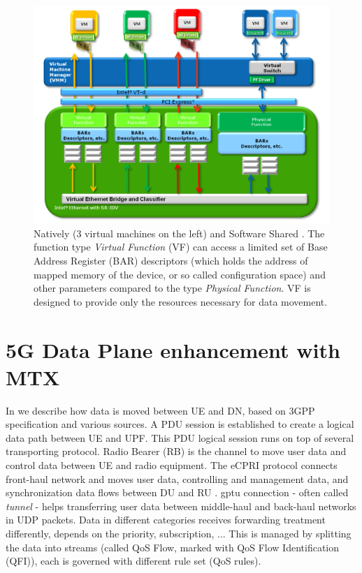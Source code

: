 \begin{figure}[H]
	\centering
	\includegraphics[width=1.0\textwidth]{resources/images/intel_sriov_Natively_and_Software_Shared.PNG}
	\caption{Natively (3 virtual machines on the left) and Software Shared \cite{intel_sriov}. The function type \textit{Virtual Function} (VF) can access a limited set of Base Address Register (BAR) descriptors (which holds the address of mapped memory of the device, or so called configuration space) and other parameters compared to the type \textit{Physical Function}. VF is designed to provide only the resources necessary for data movement.}
    \label{fig:related_work:intel_sriov_Natively_and_Software_Shared}
\end{figure}



\section{5G Data Plane enhancement with MTX}
\label{sec:related_work:5g_dataplane_enhancement}
In  we describe how data is moved between \ac{UE} and \ac{DN}, based on 3GPP specification and various sources.
A \ac{PDU} session is established to create a logical data path between \ac{UE} and \ac{UPF}.
This \ac{PDU} logical session runs on top of several transporting protocol.
Radio Bearer (RB) is the channel to move user data and control data between UE and radio equipment.
The \ac{eCPRI} protocol connects front-haul network and moves user data, controlling and management data, and synchronization data flows between DU and RU \cite{eCPRI_spec}.
\ac{gptu} connection - often called \textit{tunnel} - helps transferring user data between middle-haul and back-haul networks in UDP packets.
Data in different categories receives forwarding treatment differently, depends on the priority, subscription, ... 
This is managed by splitting the data into streams (called \ac{QoS} Flow, marked with QoS Flow Identification (QFI)), each is governed with different rule set (QoS rules).


